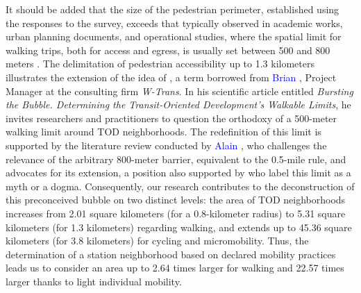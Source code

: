 \begin{refsegment}
It should be added that the size of the pedestrian perimeter, established using the responses to the survey, exceeds that typically observed in academic works, urban planning documents, and operational studies, where the spatial limit for walking trips, both for access and egress, is usually set between 500 and 800 meters \textcolor{blue}{\autocite[133]{pojani_transit-oriented_2015}}. The delimitation of pedestrian accessibility up to 1.3 kilometers illustrates the extension of the idea of , a term borrowed from \textcolor{blue}{Brian} \textcolor{blue}{\textcite[34]{canepa_bursting_2007}}, Project Manager at the consulting firm \textsl{W-Trans}. In his scientific article entitled \textsl{Bursting the Bubble. Determining the Transit-Oriented Development’s Walkable Limits}, he invites researchers and practitioners to question the orthodoxy of a 500-meter walking limit around \acrshort{TOD} neighborhoods. The redefinition of this limit is supported by the literature review conducted by \textcolor{blue}{Alain} \textcolor{blue}{\textcite[5]{lhostis_perimetres_2016}}, who challenges the relevance of the arbitrary 800-meter barrier, equivalent to the 0.5-mile rule, and advocates for its extension, a position also supported by \textcolor{blue}{\textcite[79]{ker_myths_2003}} who label this limit as a myth or a dogma. Consequently, our research contributes to the deconstruction of this preconceived bubble on two distinct levels: the area of \acrshort{TOD} neighborhoods increases from 2.01 square kilometers (for a 0.8-kilometer radius) to 5.31 square kilometers (for 1.3 kilometers) regarding walking, and extends up to 45.36 square kilometers (for 3.8 kilometers) for cycling and micromobility. Thus, the determination of a station neighborhood based on declared mobility practices leads us to consider an area up to 2.64 times larger for walking and 22.57 times larger thanks to light individual mobility.%


\end{refsegment}
